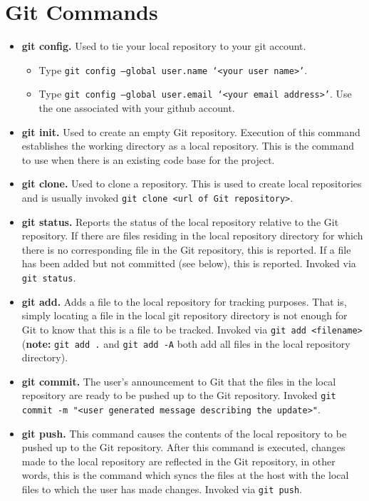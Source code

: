 \documentclass[10pt]{article}
\begin{document}
\section{Git Commands}
\begin{itemize}
	\item \textbf{git config.} Used to tie your local repository to your git account.  
	\begin{itemize}
		\item Type \texttt{git config --global user.name `<your user name>'}.
		\item Type \texttt{git config --global user.email `<your email address>'}.  Use the one associated with your github account.
	\end{itemize}
	\item \textbf{git init.} Used to create an empty Git repository.  Execution of this command establishes the working directory as a local repository.
		This is the command to use when there is an existing code base for the project.
	\item \textbf{git clone.} Used to clone a repository.  This is used to create local repositories and is usually invoked \texttt{git clone <url of Git repository>}.
	\item \textbf{git status.} Reports the status of the local repository relative to the Git repository.  If there are files residing in the local repository directory for which there is no corresponding file in the Git repository, this
		is reported.  If a file has been added but not committed (see below), this is reported.  Invoked via \texttt{git status}.
	\item \textbf{git add.} Adds a file to the local repository for tracking purposes.  That is, simply locating a file in the local git repository directory is not enough for Git to know that this is a file to be tracked.  Invoked via
		\texttt{git add <filename>} (\textbf{note:} \texttt{git add .} and \texttt{git add -A} both add all files in the local repository directory).
	\item \textbf{git commit.} The user's announcement to Git that the files in the local repository are ready to be pushed up to the Git repository.  Invoked \texttt{git commit -m "<user generated message describing the update>"}.
	\item \textbf{git push.} This command causes the contents of the local repository to be pushed up to the Git repository.  After this command is executed, changes made to the local repository are reflected in the Git repository, in
		other words, this is the command which syncs the files at the host with the local files to which the user has made changes.  Invoked via \texttt{git push}.

\end{itemize}
\end{document}
